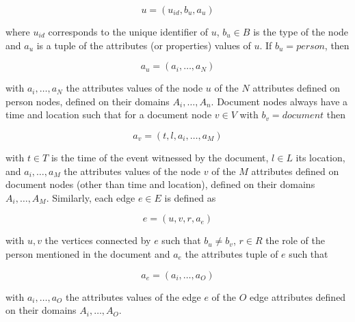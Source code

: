 \begin{equation}
    u = (u_{id}, b_u, a_u)
\end{equation}

where $u_{id}$ corresponds to the unique identifier of $u$, $b_u \in B$ is the type of the node and $a_u$ is a tuple of the attributes (or properties) values of $u$. If $b_u = person$, then

\begin{equation}
    a_u = (a_i, \dotsc, a_N)
\end{equation}

with $a_i, \dotsc, a_N$ the attributes values of the node $u$ of the $N$ attributes defined on person nodes, defined on their domains $A_i, \dotsc, A_n$.
Document nodes always have a time and location such that for a document node $v \in V$  with $b_v = document$ then

\begin{equation}
    a_v = (t, l, a_i, \dotsc, a_M)
\end{equation}

with $t \in T$ is the time of the event witnessed by the document, $l \in L$ its location, and $a_i, \dotsc, a_M$ the attributes values of the node $v$ of the $M$ attributes defined on document nodes (other than time and location), defined on their domains $A_i, \dotsc, A_M$.
Similarly, each edge $e \in E$ is defined as

\begin{equation}
    e = (u, v, r, a_e)
\end{equation}

with $u, v$ the vertices connected by $e$ such that $b_u \neq b_v$, $r \in R$ the role of the person mentioned in the document and $a_e$ the attributes tuple of $e$ such that

\begin{equation}
    a_e = (a_i, \dotsc, a_O)
\end{equation}

with $a_i, \dotsc, a_O$ the attributes values of the edge $e$ of the $O$ edge attributes defined on their domains $A_i, \dotsc, A_O$.

